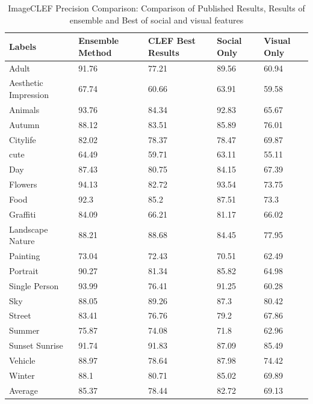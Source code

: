 \begin{table}
\centering
\caption{ ImageCLEF Precision Comparison: Comparison of Published Results, Results of ensemble and Best of social and visual features} %
\vspace*{0.2 cm}
\begin{tabular}{| p{2.1cm}| p{1.5cm}|p{1.2cm}|p{1.2cm}|p{1.2cm}|} \hline
 Labels & Ensemble Method & CLEF Best Results & Social Only & Visual Only  \\  [1ex] \hline
Adult & 91.76 & 77.21 & 89.56 & 60.94  \\  [1ex] \hline
Aesthetic Impression & 67.74 & 60.66 & 63.91 & 59.58  \\  [1ex] \hline
Animals & 93.76 & 84.34 & 92.83 & 65.67  \\  [1ex] \hline
Autumn & 88.12 & 83.51 & 85.89 & 76.01  \\  [1ex] \hline
Citylife & 82.02 & 78.37 & 78.47 & 69.87  \\  [1ex] \hline
cute & 64.49 & 59.71 & 63.11 & 55.11  \\  [1ex] \hline
Day & 87.43 & 80.75 & 84.15 & 67.39  \\  [1ex] \hline
Flowers & 94.13 & 82.72 & 93.54 & 73.75  \\  [1ex] \hline
Food & 92.3 & 85.2 & 87.51 & 73.3  \\  [1ex] \hline
Graffiti & 84.09 & 66.21 & 81.17 & 66.02  \\  [1ex] \hline
Landscape Nature & 88.21 & 88.68 & 84.45 & 77.95  \\  [1ex] \hline
Painting & 73.04 & 72.43 & 70.51 & 62.49  \\  [1ex] \hline
Portrait & 90.27 & 81.34 & 85.82 & 64.98  \\  [1ex] \hline
Single Person & 93.99 & 76.41 & 91.25 & 60.28  \\  [1ex] \hline
Sky & 88.05 & 89.26 & 87.3 & 80.42  \\  [1ex] \hline
Street & 83.41 & 76.76 & 79.2 & 67.86  \\  [1ex] \hline
Summer & 75.87 & 74.08 & 71.8 & 62.96  \\  [1ex] \hline
Sunset Sunrise & 91.74 & 91.83 & 87.09 & 85.49  \\  [1ex] \hline
Vehicle & 88.97 & 78.64 & 87.98 & 74.42  \\  [1ex] \hline
Winter & 88.1 & 80.71 & 85.02 & 69.89  \\  [1ex] \hline
Average & 85.37 & 78.44 & 82.72 & 69.13  \\  [1ex] \hline
\end{tabular}
 \label{ImageCLEFPrecisionOverAll} %
\end{table}

